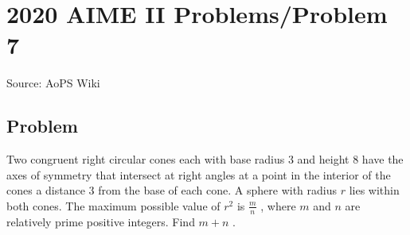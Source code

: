 \documentclass[12pt]{article}
\begin{document}
\section*{{2020 AIME II Problems/Problem 7}}
Source: AoPS Wiki

\subsection*{Problem}
Two congruent right circular cones each with base radius $3$ and height $8$ have the axes of symmetry that intersect at right angles at a point in the interior of the cones a distance $3$ from the base of each cone. A sphere with radius $r$ lies within both cones. The maximum possible value of $r^2$ is $\frac{m}{n}$ , where $m$ and $n$ are relatively prime positive integers. Find $m+n$ .
\end{document}

